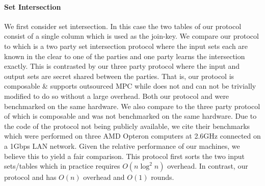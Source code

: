 %



\paragraph{Set Intersection} We first consider set intersection. In this case the two tables of our protocol consist of a single column which is used as the join-key. We compare our protocol to \cite{CCS:KKRT16} which is a two party set intersection protocol where the input sets each are known in the clear to one of the parties and one party learns the intersection exactly. This is contrasted by our three party protocol where the input and output sets are secret shared between the parties. That is, our protocol is composable \& supports outsourced MPC while \cite{CCS:KKRT16} does not and can not be trivially modified to do so without a large overhead. Both our protocol and \cite{CCS:KKRT16} were benchmarked on the same hardware. We also compare to the three party protocol of \cite{ASIACCS:BlaAgu12} which is composable and was not benchmarked on the same hardware. Due to the code of the \cite{ASIACCS:BlaAgu12} protocol not being publicly available, we cite their benchmarks which were performed on three AMD Opteron computers at 2.6GHz connected on a 1Gbps LAN network. Given the relative performance of our machines, we believe this to yield a fair comparison. This protocol first sorts the two input sets/tables which in practice requires $O(n\log^2 n)$ overhead\cite{ASIACCS:BlaAgu12}. In contrast, our protocol and \cite{CCS:KKRT16} has $O(n)$ overhead and $O(1)$ rounds. 


